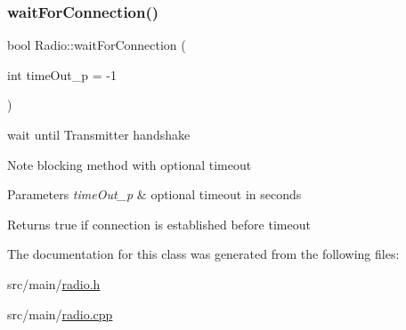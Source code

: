 \subsubsection{\texorpdfstring{wait\+For\+Connection()}{waitForConnection()}}
{\footnotesize\ttfamily bool Radio\+::wait\+For\+Connection (\begin{DoxyParamCaption}\item[{int}]{time\+Out\+\_\+p = {\ttfamily -\/1} }\end{DoxyParamCaption})}



wait until Transmitter handshake 

\begin{DoxyNote}{Note}
blocking method with optional timeout 
\end{DoxyNote}

\begin{DoxyParams}{Parameters}
{\em time\+Out\+\_\+p} & optional timeout in seconds \\
\hline
\end{DoxyParams}
\begin{DoxyReturn}{Returns}
true if connection is established before timeout 
\end{DoxyReturn}


The documentation for this class was generated from the following files\+:\begin{DoxyCompactItemize}
\item 
src/main/\hyperlink{radio_8h}{radio.\+h}\item 
src/main/\hyperlink{radio_8cpp}{radio.\+cpp}\end{DoxyCompactItemize}
